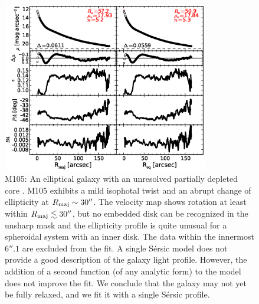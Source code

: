 \documentclass[preprint2]{emulateapj}
\newcommand{\fitfigurewidth}{0.8\textwidth}
\begin{document}
  \begin{figure}[h]
  \begin{center}
  \includegraphics[width=\fitfigurewidth]{images/m105_1Dfit.eps}
  \caption{M105: 
  An elliptical galaxy with an unresolved partially depleted core \citep{rusli2013}. %
  M105 exhibits a mild isophotal twist and an abrupt change of ellipticity at $R_{\rm maj} \sim 30''$.
  The velocity map shows rotation at least within $R_{\rm maj} \lesssim 30''$, 
  but no embedded disk can be recognized in the unsharp mask 
  and the ellipticity profile is quite unusual for a spheroidal system with an inner disk.
  The data within the innermost $6''.1$ are excluded from the fit.
  A single S\'ersic model does not provide a good description of the galaxy light profile.
  However, the addition of a second function (of any analytic form) to the model does not improve the fit.
  We conclude that the galaxy may not yet be fully relaxed, and we fit it with a single S\'ersic profile. 
  }
  \end{center}
  \end{figure}
\end{document}
